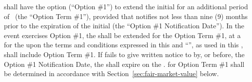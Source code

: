 \label{sec:option-i}
\lessee shall have the option (``Option \#1'') to extend the initial \termOfLease for an additional period of \optionILengthText\ (the ``Option Term \#1''), provided that \lessee notifies \lessor not less than nine (9) months prior to the expiration of the initial \termOfLease (the ``Option \#1 Notification Date''). In the event \lessee exercises Option \#1, the \termOfLease shall be extended for the Option Term \#1, at a  for the \premises upon the terms and conditions expressed in this \lease and ``\termOfLease'', as used in this \lease, shall include Option Term \#1. If \lessee fails to give written notice to \lessor by, or before, the Option \#1 Notification Date, the \lease shall expire on the \expirationDate. \fairMarketValue for Option Term \#1 shall be determined in accordance with Section~\ref{sec:fair-market-value} below.
